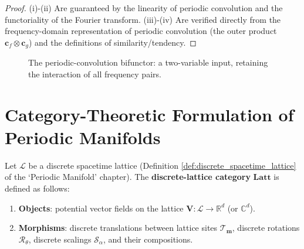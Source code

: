 \begin{proof}
(i)-(ii) Are guaranteed by the linearity of periodic convolution and the functoriality of the Fourier transform. (iii)-(iv) Are verified directly from the frequency-domain representation of periodic convolution (the outer product $\mathbf{c}_f \otimes \mathbf{c}_g$) and the definitions of similarity/tendency.
\end{proof}

\begin{figure}[htbp]
\centering
{}
\caption{The periodic-convolution bifunctor: a two-variable input, retaining the interaction of all frequency pairs.}
\label{fig:periodic_convolution_bifunctor}
\end{figure}

\section{Category-Theoretic Formulation of Periodic Manifolds}\label{sec:periodic_manifold_category}

\begin{definition}\label{def:discrete_lattice_category}
Let $\mathcal{L}$ be a discrete spacetime lattice (Definition \ref{def:discrete_spacetime_lattice} of the `Periodic Manifold' chapter). The \textbf{discrete-lattice category} $\mathbf{Latt}$ is defined as follows:
\begin{enumerate}[label=(\roman*)]
    \item \textbf{Objects}: potential vector fields on the lattice $\mathbf{V}: \mathcal{L} \to \mathbb{R}^d$ (or $\mathbb{C}^d$).
    \item \textbf{Morphisms}: discrete translations between lattice sites $\mathcal{T}_{\mathbf{m}}$, discrete rotations $\mathcal{R}_\theta$, discrete scalings $\mathcal{S}_\alpha$, and their compositions.
\end{enumerate}
\end{definition}

